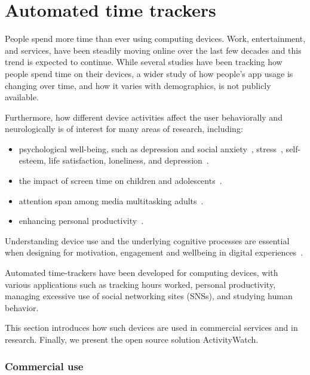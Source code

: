 \section{Automated time trackers}

    People spend more time than ever using computing devices. Work, entertainment, and services, have been steadily moving online over the last few decades and this trend is expected to continue.
    While several studies have been tracking how people spend time on their devices, a wider study of how people's app usage is changing over time, and how it varies with demographics, is not publicly available.

    Furthermore, how different device activities affect the user behaviorally and neurologically is of interest for many areas of research, including:

    \begin{itemize}
        \item psychological well-being, such as depression and social anxiety~\cite{selfhout_different_2009}\cite{shah_nonrecursive_2002}, stress~\cite{mark_stress_2014}, self-esteem, life satisfaction, loneliness, and depression~\cite{huang_time_2017}.
        \item the impact of screen time on children and adolescents~\cite{subrahmanyam_impact_2001}.
        \item attention span among media multitasking adults~\cite{mark_stress_2014}.
        \item enhancing personal productivity~\cite{kim_timeaware_2016}.
    \end{itemize}

    Understanding device use and the underlying cognitive processes are essential when designing for motivation, engagement and wellbeing in digital experiences~\cite{peters_designing_2018}.

    Automated time-trackers have been developed for computing devices, with various applications such as tracking hours worked, personal productivity, managing excessive use of social networking sites (SNSs), and studying human behavior.

    This section introduces how such devices are used in commercial services and in research. Finally, we present the open source solution ActivityWatch.

    \subsubsection*{Commercial use}

